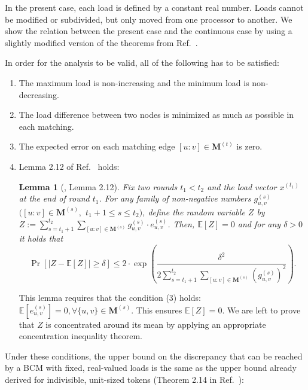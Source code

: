 \documentclass[12pt,psfig,a4]{article}
\newtheorem{mylemma}{Lemma}
\theoremstyle{plain}
\begin{document}
In the present case, each load is defined by a constant real number. Loads cannot be modified or subdivided, but only moved from one processor to another. 
We show the relation between the present case and the continuous case by using a slightly modified version of the theorems from Ref.~\cite{sauerwald2012tight}.

In order for the analysis to be valid, all of the following has to be satisfied:
\begin{enumerate}
	\item The maximum load is non-increasing and the minimum load is non-decreasing.
	\item The load difference between two nodes is minimized as much as possible in each matching. 
	\item The expected error on each matching edge $[u : v] \in \mathbf{M}^{(t)}$ is zero. 
	\item Lemma 2.12 of Ref.~\cite{sauerwald2012tight} holds:
	\begin{mylemma}[\cite{sauerwald2012tight}, Lemma 2.12] 
	\label{lemma:first}
		Fix two rounds $t_1<t_2$ and the load vector $x^{(t_1)}$ at the end of round $t_1$. For any family of non-negative numbers $g_{u,v}^{(s)}$ $( [u : v] \in \mathbf{M}^{(s)},$ $t_1+1\leq s \leq t_2)$, define the random variable $Z$ by $Z:=\sum_{s=t_1+1}^{t_2}\sum_{[u : v] \in \mathbf{M}^{(s)}}g_{u,v}^{(s)}  \cdot e_{u,v}^{(s)}$. Then, $\mathbb{E}[Z]=0$ and for any $\delta>0$ it holds that
		\begin{equation}
			\Pr\left [ \left | Z - \mathbb{E}[Z] \right | \geq \delta  \right  ] \leq 2 \cdot \exp \left ( \frac{\delta^{2}}{2 \sum_{s=t_1+1}^{t_2}\sum_{[u : v] \in \mathbf{M}^{(s)}} \left (g_{u,v}^{(s)} \right )^{2}}\right ).
		\end{equation}
	\end{mylemma}
	This lemma requires that the condition (3) holds: $\mathbb{E}\left [e_{u,v}^{(s)} \right]=0, \forall \{u, v\} \in \mathbf{M}^{(s)}$. This ensures $\mathbb{E}\left [ Z \right ]=0$. We are left to prove that $Z$ is concentrated around its mean by applying an appropriate concentration inequality theorem.
\end{enumerate}
Under these conditions, the upper bound on the discrepancy that can be reached by a BCM with fixed, real-valued loads is the same as the upper bound already derived for indivisible, unit-sized tokens (Theorem 2.14 in Ref.~\cite{sauerwald2012tight}):
\end{document}
